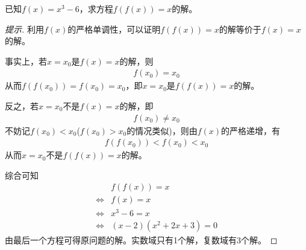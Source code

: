 \begin{example}[清华自主招生题]
  已知$f(x)=x^3-6$，求方程$f(f(x))=x$的解。
\end{example}
\begin{proof}[提示]
  利用$f(x)$的严格单调性，可以证明$f(f(x))=x$的解等价于$f(x)=x$的解。

  事实上，若$x=x_0$是$f(x)=x$的解，则
  \begin{align*}
    f(x_0) = x_0
  \end{align*}
  从而$f(f(x_0))=f(x_0)=x_0$，即$x=x_0$是$f(f(x))=x$的解。

  反之，若$x=x_0$不是$f(x)=x$的解，即
  \begin{align*}
    f(x_0)\ne x_0
  \end{align*}
  不妨记$f(x_0) < x_0$($f(x_0)>x_0$的情况类似)，则由$f(x)$的严格递增，有
  \begin{align*}
    f(f(x_0)) < f(x_0) < x_0
  \end{align*}
  从而$x=x_0$不是$f(f(x))=x$的解。

  综合可知
  \begin{align*}
        & f(f(x))=x\\
    \iff& f(x) = x\\
    \iff& x^3 - 6 = x\\
    \iff& (x-2)(x^2+2x+3) = 0
  \end{align*}
  由最后一个方程可得原问题的解。实数域只有1个解，复数域有3个解。
\end{proof}
